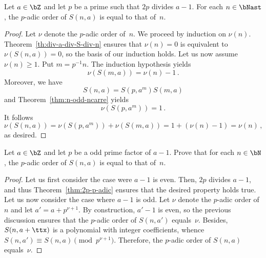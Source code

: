  \begin{theorem} \label{thm:2p-p-adic}
   Let $a \in \bZ$ and let $p$ be a prime such that $2p$ divides $a - 1$.
   For each $n \in \bNast$, the $p$-adic order of $S(n, a)$ is equal to that of~$n$.
 \end{theorem}

 \begin{proof}
   Let $\nu$ denote the $p$-adic order of~$n$.
   We proceed by induction on $\nu(n)$.
   Theorem~\ref{th:div-a-div-S-div-n} ensures that $\nu(n) = 0$ is equivalent to  $\nu(S(n, a)) = 0$,
   so the basis of our induction holds.
   Let us now assume $\nu(n) \ge 1$.
   Put $m =  p^{-1} n$.
   The induction hypothesis yields
   $$
   \nu(S(m, a)) = \nu(n) - 1 \, .
   $$
   Moreover, we have 
   $$
   S(n, a) = S(p, a^m) S(m, a) 
   $$
   and Theorem~\ref{thm:n-odd-ncarre} yields 
   $$\nu(S(p, a^m)) = 1 \, .$$
   It follows
   $$
   \nu(S(n, a))
   = \nu(S(p, a^m)) + \nu(S(m, a))
   = 1 + (\nu(n) - 1)
   = \nu(n) \,, 
   $$
   as desired.  
 \end{proof}

 \begin{exercise} \label{exo:p-p-adic}
   Let $a \in \bZ$ and let $p$ be a odd prime factor of $a - 1$.
   Prove that for each $n \in \bN$, the $p$-adic order of $S(n, a)$ is equal to that of~$n$.
 \end{exercise}

 \begin{proof}
   Let us first consider the case were $a - 1$ is even.
   Then, $2p$ divides $a - 1$,
   and thus Theorem~\ref{thm:2p-p-adic} ensures that the desired property holds true.
   Let us now consider the case where $a - 1$ is odd.
   Let $\nu$ denote the $p$-adic order of $n$ and let $a' = a + p^{\nu + 1}$.
   By construction, $a' - 1$ is even,
   so the previous discussion ensures that the $p$-adic order of $S(n, a')$ equals~$\nu$.
   Besides, $S(n, a + \ttx)$ is a polynomial with integer coefficients,
   whence $S(n, a') \equiv S(n, a) \pmod{p^{\nu + 1}}$.
   Therefore, the $p$-adic order of $S(n, a)$ equals~$\nu$.   
 \end{proof}
 
 



